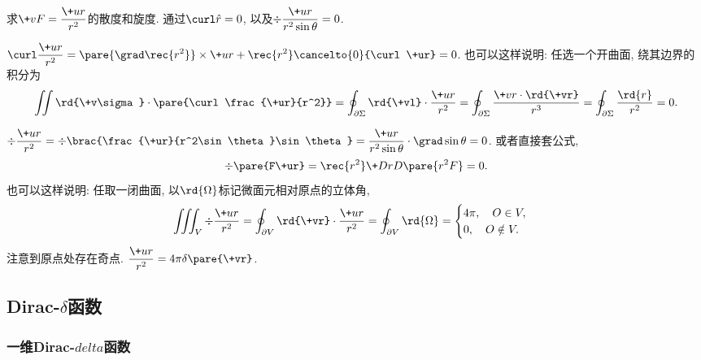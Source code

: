 \documentclass[hidelinks]{ctexart}
\begin{document}
\begin{ex}
    求$\displaystyle \+vF = \frac{\+ur}{r^2}$的散度和旋度. 通过$\displaystyle \curl \hat r = 0$, 以及$\displaystyle \div \frac{\+ur}{r^2\sin\theta} = 0$.
    \begin{cenum}
        \item $\displaystyle \curl \frac{\+ur}{r^2} = \pare{\grad\rec{r^2}}\times\+ur + \rec{r^2}\cancelto{0}{\curl \+ur} = 0$. 也可以这样说明: 任选一个开曲面, 绕其边界的积分为
        \[ \iint \rd{\+v\sigma} \cdot \pare{\curl \frac{\+ur}{r^2}} = \oint_{\partial \Sigma} \rd{\+vl} \cdot \frac{\+ur}{r^2} = \oint_{\partial \Sigma} \frac{\+vr\cdot\rd{\+vr}}{r^3} = \oint_{\partial \Sigma} \frac{\rd{r}}{r^2} = 0. \]
        \item $\displaystyle \div \frac{\+ur}{r^2} = \div\brac{\frac{\+ur}{r^2\sin\theta}\sin\theta} = \frac{\+ur}{r^2\sin\theta}\cdot \grad \sin\theta = 0$. 或者直接套公式,
        \[ \div\pare{F\+ur} = \rec{r^2}\+DrD{}\pare{r^2 F} = 0. \]
        也可以这样说明: 任取一闭曲面, 以$\rd{\Omega}$标记微面元相对原点的立体角,
        \[ \iiint_V \div \frac{\+ur}{r^2} = \oint_{\partial V}\rd{\+vr}\cdot \frac{\+ur}{r^2} = \oint_{\partial V} \rd{\Omega} = \begin{cases}
            4\pi,\quad O\in V,\\
            0,\quad O \notin V.
        \end{cases} \]
        注意到原点处存在奇点. $\displaystyle \frac{\+ur}{r^2} = 4\pi \delta\pare{\+vr}$.
    \end{cenum}
\end{ex}



\subsection{Dirac-\texorpdfstring{$\delta$}{Delta}函数} %
\label{sub:dirac_delta函数}

\subsubsection{一维Dirac-\texorpdfstring{$delta$}{Delta}函数} %
\label{ssub:一维dirac_delta函数}
\end{document}
